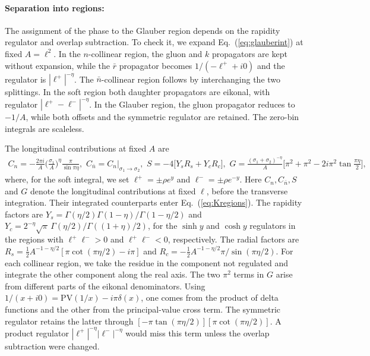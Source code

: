 \documentclass[%
 onecolumn,
 superscriptaddress,
 preprintnumbers,
 nofootinbib,
 amsmath,amssymb,
 aps,
 prl,
]{revtex4-2}
\begin{document}
\paragraph{Separation into regions: }
The assignment of the phase to the Glauber region depends on the
rapidity regulator and overlap subtraction. To check it, we expand
Eq.~(\ref{eq:glauberint}) at fixed
$A=\boldsymbol\ell^2$. In the $n$-collinear region, the gluon
and $k$ propagators are kept without expansion, while the $\bar r$
propagator becomes $1/(-\ell^++i0)$ and the regulator is
$|\ell^+|^{-\eta}$. The $\bar n$-collinear region follows by
interchanging the two splittings. In the soft region both daughter
propagators are eikonal, with regulator
$|\ell^+-\ell^-|^{-\eta}$. In the Glauber region, the gluon
propagator reduces to $-1/A$, while both offsets and the symmetric
regulator are retained. The zero-bin integrals are scaleless.

The longitudinal contributions at fixed $A$ are
\begin{equation}
\begin{aligned}
C_n=-\frac{2\pi i}A\Big(\frac{\sigma_1}A\Big)^{\eta}\frac\pi{\sin\pi\eta},
\hspace{4pt}
C_{\bar n}=C_n\big|_{\sigma_1\to\sigma_2},
\hspace{4pt}
S=-4\big[Y_sR_s+Y_cR_c\big],
\hspace{4pt}
G=\frac{(\sigma_1+\sigma_2)^{-\eta}}A\Big[\pi^2+\pi^2-2i\pi^2\tan\frac{\pi\eta}2\Big],
\end{aligned}
\label{eq:glauberregions}
\end{equation}
where, for the soft integral, we set
$\ell^+=\pm\rho e^y$ and $\ell^-=\pm\rho e^{-y}$.
Here $C_n,C_{\bar n},S$ and $G$ denote the
longitudinal contributions at fixed
$\boldsymbol\ell$, before the transverse
integration. Their integrated counterparts
enter Eq.~(\ref{eq:Kregions}).
The rapidity factors are
$Y_s=\Gamma(\eta/2)\Gamma(1-\eta)/\Gamma(1-\eta/2)$ and
$Y_c=2^{-\eta}\sqrt\pi\,\Gamma(\eta/2)/\Gamma((1+\eta)/2)$,
for the $\sinh y$ and $\cosh y$ regulators in the regions with
$\ell^+\ell^->0$ and $\ell^+\ell^-<0$, respectively. The
radial factors are
$R_s=\tfrac12A^{-1-\eta/2}[\pi\cot(\pi\eta/2)-i\pi]$ and
$R_c=-\tfrac12A^{-1-\eta/2}\pi/\sin(\pi\eta/2)$.
For each collinear region, we take the residue in the component
not regulated and integrate the other component along the real axis.
%
The two $\pi^2$ terms in $G$ arise from different parts of the
eikonal denominators. Using
$1/(x+i0)=\mathrm{PV}(1/x)-i\pi\delta(x)$, one comes from the
product of delta functions and the other from the principal-value
cross term. The symmetric regulator retains the latter through
$[-\pi\tan(\pi\eta/2)][\pi\cot(\pi\eta/2)]$. A product
regulator $|\ell^+|^{-\eta}|\ell^-|^{-\eta}$ would miss this
term unless the overlap subtraction were changed.
\end{document}
